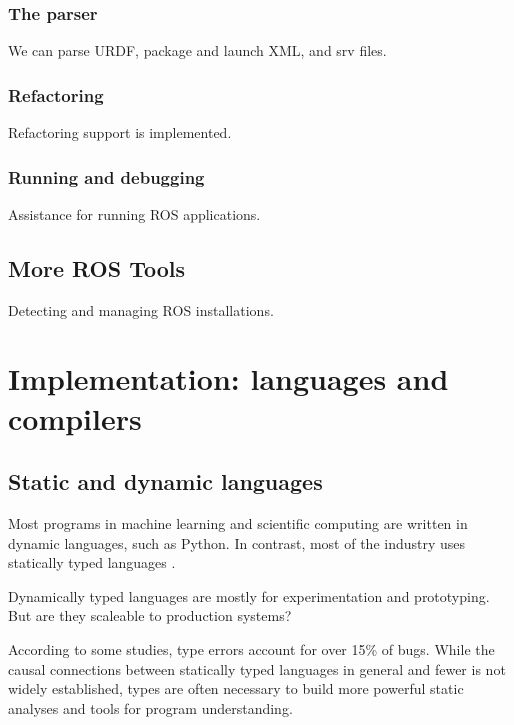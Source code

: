\documentclass[12pt,initial,twoside,maitrise]{dms}
\numberwithin{equation}{section}
\numberwithin{table}{chapter}
\numberwithin{figure}{chapter}
\begin{document}
\subsection{The parser}

We can parse URDF, package and launch XML, and srv files.

\subsection{Refactoring}

Refactoring support is implemented.

\subsection{Running and debugging}

Assistance for running ROS applications.

\section{More ROS Tools}

Detecting and managing ROS installations.

\chapter{Implementation: languages and compilers}


\section{Static and dynamic languages}

Most programs in machine learning and scientific computing are written in dynamic languages, such as Python. In contrast, most of the industry uses statically typed languages \cite{github}.

Dynamically typed languages are mostly for experimentation and prototyping. But are they scaleable to production systems?

According to some studies, type errors account for over 15\% of bugs. \cite{gao2017type} While the causal connections between statically typed languages in general and fewer is not widely established, types are often necessary to build more powerful static analyses and tools for program understanding.
\end{document}
